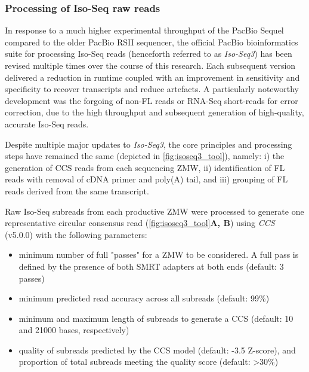\clearpage
\subsubsection{Processing of Iso-Seq raw reads}
\label{section: Isoseq_rawprocessing}
In response to a much higher experimental throughput of the PacBio Sequel compared to the older PacBio RSII sequencer, the official PacBio bioinformatics suite for processing Iso-Seq reads (henceforth referred to as \textit{Iso-Seq3}) has been revised multiple times over the course of this research. Each subsequent version delivered a reduction in runtime coupled with an improvement in sensitivity and specificity to recover transcripts and reduce artefacts. A particularly noteworthy development was the forgoing of non-FL reads or RNA-Seq short-reads for error correction, due to the high throughput and subsequent generation of high-quality, accurate Iso-Seq reads. 

Despite multiple major updates to \textit{Iso-Seq3}, the core principles and processing steps have remained the same (depicted in \cref{fig:isoseq3_tool}), namely: i) the generation of CCS reads from each sequencing ZMW, ii) identification of FL reads with removal of cDNA primer and poly(A) tail, and iii) grouping of FL reads derived from the same transcript. 

Raw Iso-Seq subreads from each productive ZMW were processed to generate one representative circular consensus read (\cref{fig:isoseq3_tool}\textbf{A, B}) using \textit{CCS} (v5.0.0) with the following parameters: 
\begin{itemize}
	\item minimum number of full "passes" for a ZMW to be considered. A full pass is defined by the presence of both SMRT adapters at both ends (default: 3 passes)
	\item minimum predicted read accuracy across all subreads (default: 99\%)
	\item minimum and maximum length of subreads to generate a CCS (default: 10 and 21000 bases, respectively)
	\item quality of subreads predicted by the CCS model (default: -3.5 Z-score), and proportion of total subreads meeting the quality score (default: \textgreater 30\%)
\end{itemize}


